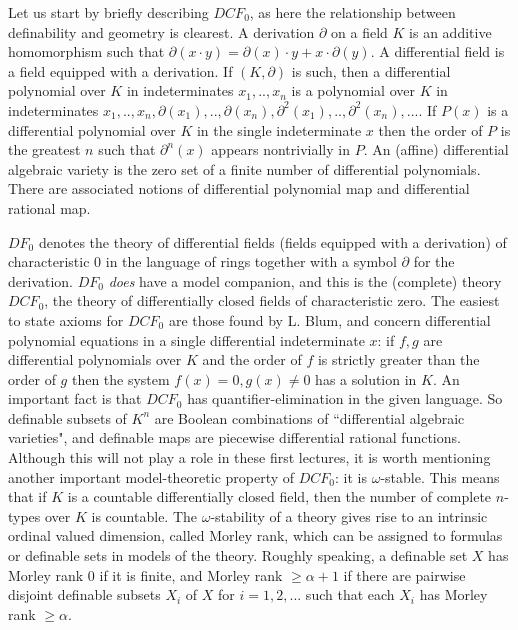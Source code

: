 Let us start by briefly describing $DCF_{0}$,
as here the relationship between definability
and geometry is clearest. A derivation
$\partial$ on a field $K$ is an additive
homomorphism such that $\partial(x\cdot y) =
\partial(x)\cdot y + x\cdot\partial(y)$. A
differential field is a field equipped with a
derivation. If $(K,\partial)$ is such, then a
differential polynomial over $K$ in
indeterminates $x_{1},..,x_{n}$ is a
polynomial over $K$ in indeterminates
$x_{1},..,x_{n},\partial(x_{1}),..,
\partial(x_{n}),\partial^{2}(x_{1}),..,
\partial^{2}(x_{n}),...$. If $P(x)$ is a
differential polynomial over $K$ in the single
indeterminate $x$ then the order of $P$ is the
greatest $n$ such that $\partial^{n}(x)$
appears nontrivially in $P$. An (affine)
differential algebraic variety is the zero set
of a finite number of differential polynomials.
There are associated notions of differential
polynomial map and differential rational map.


$DF_{0}$ denotes the
theory of differential fields (fields equipped
with a derivation) of characteristic $0$ in
the language of rings together with a symbol
$\partial$ for the derivation. $DF_{0}$ {\em
does} have a model companion, and this is the
(complete) theory $DCF_{0}$, the theory of
differentially closed fields of characteristic
zero. The easiest to state axioms for
$DCF_{0}$ are those found by L. Blum, and
concern differential polynomial equations in a
single differential indeterminate $x$: if
$f,g$ are differential polynomials over $K$ and
the order of
$f$ is strictly greater than the order of $g$
then the system
$f(x) = 0, g(x)\neq 0$ has a solution in $K$.
An important fact is that $DCF_{0}$ has
quantifier-elimination in the given language.
So definable subsets of $K^{n}$ are Boolean
combinations of ``differential
algebraic varieties", and definable maps are
piecewise differential rational
functions. Although this will not play
a role in these first lectures, it is
worth mentioning another important
model-theoretic property of $DCF_{0}$: it is
$\omega$-stable. This means that if $K$ is a
countable differentially closed field, then
the number of complete $n$-types over $K$ is
countable. The $\omega$-stability of a theory
gives rise to an intrinsic ordinal valued
dimension, called Morley rank, which can be
assigned to formulas or definable sets in
models of the theory. Roughly speaking, a
definable set $X$ has Morley rank $0$ if it
is finite, and Morley rank $\geq\alpha + 1$
if there are pairwise disjoint definable
subsets $X_{i}$ of $X$ for $i=1,2,...$ such
that each $X_{i}$ has Morley rank
$\geq\alpha$.

